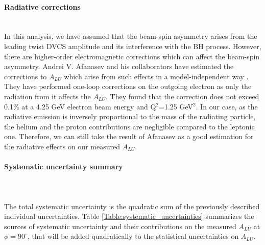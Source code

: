 \paragraph{Radiative corrections}
~\\

In this analysis, we have assumed that the beam-spin asymmetry arises from the leading twist DVCS amplitude and its interference with the BH process. However, there are higher-order electromagnetic corrections which can affect the beam-spin asymmetry. Andrei V. Afanasev and his collaborators have estimated the corrections to $A_{LU}$ which arise from such effects in a model-independent way \cite{Afanasev}. They have performed one-loop corrections on the outgoing electron as only the radiation from it affects the $A_{LU}$. They found that the correction does not exceed 0.1$\%$ at a 4.25 GeV electron beam energy and Q$^{2}$=1.25 GeV$^{2}$. In our case, as the radiative emission is inversely proportional to the mass of the radiating particle, the helium and the proton contributions are negligible compared to the leptonic one. Therefore, we can still take the result of Afanasev as a good estimation for the radiative  effects on our measured $A_{LU}$.\\



\paragraph{Systematic uncertainty summary}
~\\
~\\
The total systematic uncertainty is the quadratic sum of the previously described individual uncertainties. Table \ref{Table:systematic_uncertainties} summarizes the sources of systematic uncertainty and their contributions on the measured $A_{LU}$ at $\phi = 90^{\circ}$, that will be added quadratically to the statistical uncertainties on $A_{LU}$. 

